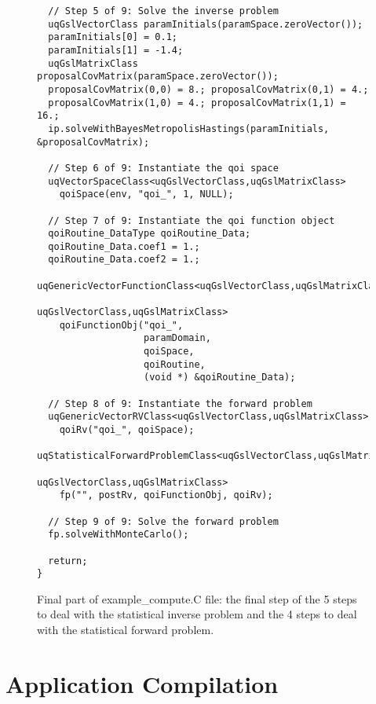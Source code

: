 \begin{figure}[h!]
\begin{center}
\begin{verbatim}
  // Step 5 of 9: Solve the inverse problem
  uqGslVectorClass paramInitials(paramSpace.zeroVector());
  paramInitials[0] = 0.1;
  paramInitials[1] = -1.4;
  uqGslMatrixClass proposalCovMatrix(paramSpace.zeroVector());
  proposalCovMatrix(0,0) = 8.; proposalCovMatrix(0,1) = 4.;
  proposalCovMatrix(1,0) = 4.; proposalCovMatrix(1,1) = 16.;
  ip.solveWithBayesMetropolisHastings(paramInitials, &proposalCovMatrix);

  // Step 6 of 9: Instantiate the qoi space
  uqVectorSpaceClass<uqGslVectorClass,uqGslMatrixClass>
    qoiSpace(env, "qoi_", 1, NULL);

  // Step 7 of 9: Instantiate the qoi function object
  qoiRoutine_DataType qoiRoutine_Data;
  qoiRoutine_Data.coef1 = 1.;
  qoiRoutine_Data.coef2 = 1.;
  uqGenericVectorFunctionClass<uqGslVectorClass,uqGslMatrixClass,
                               uqGslVectorClass,uqGslMatrixClass>
    qoiFunctionObj("qoi_",
                   paramDomain,
                   qoiSpace,
                   qoiRoutine,
                   (void *) &qoiRoutine_Data);

  // Step 8 of 9: Instantiate the forward problem
  uqGenericVectorRVClass<uqGslVectorClass,uqGslMatrixClass>
    qoiRv("qoi_", qoiSpace);
  uqStatisticalForwardProblemClass<uqGslVectorClass,uqGslMatrixClass,
                                   uqGslVectorClass,uqGslMatrixClass>
    fp("", postRv, qoiFunctionObj, qoiRv);

  // Step 9 of 9: Solve the forward problem
  fp.solveWithMonteCarlo();

  return;
}
\end{verbatim}
\end{center}
\caption{
Final part of example\_compute.C file: the final step of the 5 steps to deal with the statistical inverse problem and the 4 steps to deal with the statistical forward problem.
}
\label{fig-compute-c2}
\end{figure}

\clearpage
\section{Application Compilation}

